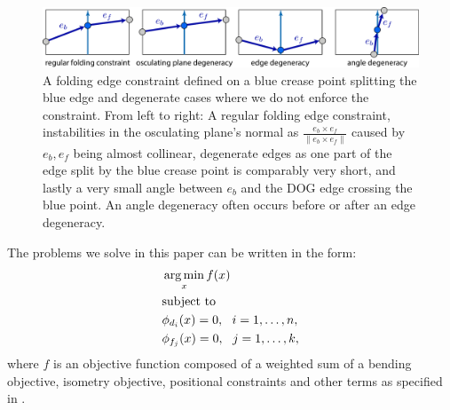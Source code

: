 \begin{figure} [h]
	\centering
	\includegraphics[width=\linewidth]{figures/fold_const_degeneracies}
	\caption{A folding edge constraint defined on a blue crease point splitting the blue edge and degenerate cases where we do not enforce the constraint. From left to right: A regular folding edge constraint, instabilities in the osculating plane's normal as $\frac{e_b \times e_f}{\|e_b \times e_f\|}$ caused by $e_b,e_f$ being almost collinear, degenerate edges as one part of the edge split by the blue crease point is comparably very short, and lastly a very small angle between $e_b$ and the DOG edge crossing the blue point. An angle degeneracy often occurs before or after an edge degeneracy.}
	\label{fig:fold_const_degeneracies}
\end{figure}

The problems we solve in this paper can be written in the form:
\begin{equation} \label{eq:const_opt}
\begin{aligned}
& \operatorname*{arg\,min}_x f(x) \\
& \textrm{subject to} \\
& \phi_{d_i}(x) = 0, \ \  i = 1, \ldots, n, \\
& \phi_{f_j}(x) = 0, \ \  j = 1, \ldots, k, \\ 
\end{aligned}
\end{equation}
where $f$ is an objective function composed of a weighted sum of a bending objective, isometry objective, positional constraints and other terms as specified in . 

